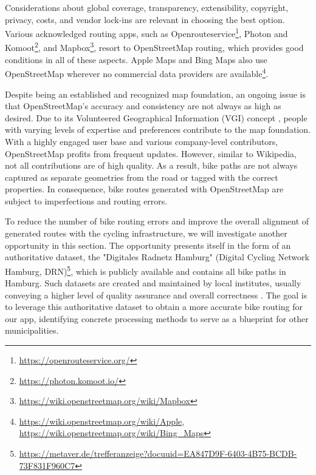 Considerations about global coverage, transparency, extensibility, copyright, privacy, costs, and vendor lock-ins are relevant in choosing the best option. Various acknowledged routing apps, such as Openrouteservice\footnote{\url{https://openrouteservice.org/}}, Photon and Komoot\footnote{\url{https://photon.komoot.io/}}, and Mapbox\footnote{\url{https://wiki.openstreetmap.org/wiki/Mapbox}}, resort to OpenStreetMap routing, which provides good conditions in all of these aspects. Apple Maps and Bing Maps also use OpenStreetMap wherever no commercial data providers are available\footnote{\url{https://wiki.openstreetmap.org/wiki/Apple}, \url{https://wiki.openstreetmap.org/wiki/Bing_Maps}}. 

Despite being an established and recognized map foundation, an ongoing issue is that OpenStreetMap's accuracy and consistency are not always as high as desired. Due to its Volunteered Geographical Information (VGI) concept \cite{wasserman_evaluating_2019, jacobs_openstreetmap_2020, vybornova_automated_2023}, people with varying levels of expertise and preferences contribute to the map foundation. With a highly engaged user base and various company-level contributors, OpenStreetMap profits from frequent updates. However, similar to Wikipedia, not all contributions are of high quality. As a result, bike paths are not always captured as separate geometries from the road or tagged with the correct properties. In consequence, bike routes generated with OpenStreetMap are subject to imperfections and routing errors.

To reduce the number of bike routing errors and improve the overall alignment of generated routes with the cycling infrastructure, we will investigate another opportunity in this section. The opportunity presents itself in the form of an authoritative dataset, the "Digitales Radnetz Hamburg" (Digital Cycling Network Hamburg, DRN)\footnote{\url{https://metaver.de/trefferanzeige?docuuid=EA847D9F-6403-4B75-BCDB-73F831F960C7}}, which is publicly available and contains all bike paths in Hamburg. Such datasets are created and maintained by local institutes, usually conveying a higher level of quality assurance and overall correctness \cite{englede_efficient_2013, brovelli_towards_2017}. The goal is to leverage this authoritative dataset to obtain a more accurate bike routing for our app, identifying concrete processing methods to serve as a blueprint for other municipalities.

